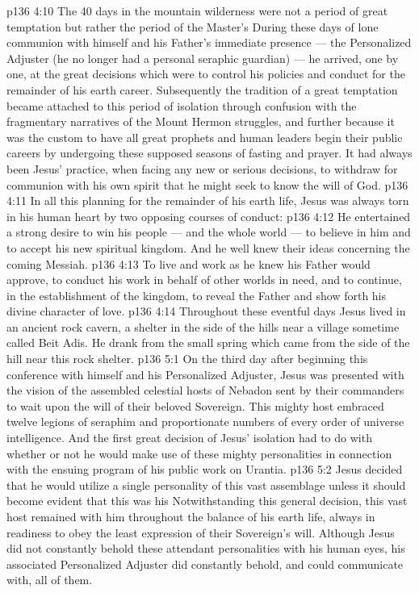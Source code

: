 \vs p136 4:10 \pc The 40 days in the mountain wilderness were not a period of great temptation but rather the period of the Master’s  During these days of lone communion with himself and his Father’s immediate presence --- the Personalized Adjuster (he no longer had a personal seraphic guardian) --- he arrived, one by one, at the great decisions which were to control his policies and conduct for the remainder of his earth career. Subsequently the tradition of a great temptation became attached to this period of isolation through confusion with the fragmentary narratives of the Mount Hermon struggles, and further because it was the custom to have all great prophets and human leaders begin their public careers by undergoing these supposed seasons of fasting and prayer. It had always been Jesus’ practice, when facing any new or serious decisions, to withdraw for communion with his own spirit that he might seek to know the will of God.
\vs p136 4:11 \pc In all this planning for the remainder of his earth life, Jesus was always torn in his human heart by two opposing courses of conduct:
\vs p136 4:12 \bibnobreakspace He entertained a strong desire to win his people --- and the whole world --- to believe in him and to accept his new spiritual kingdom. And he well knew their ideas concerning the coming Messiah.
\vs p136 4:13 \bibnobreakspace To live and work as he knew his Father would approve, to conduct his work in behalf of other worlds in need, and to continue, in the establishment of the kingdom, to reveal the Father and show forth his divine character of love.
\vs p136 4:14 \pc Throughout these eventful days Jesus lived in an ancient rock cavern, a shelter in the side of the hills near a village sometime called Beit Adis. He drank from the small spring which came from the side of the hill near this rock shelter.
\vs p136 5:1 On the third day after beginning this conference with himself and his Personalized Adjuster, Jesus was presented with the vision of the assembled celestial hosts of Nebadon sent by their commanders to wait upon the will of their beloved Sovereign. This mighty host embraced twelve legions of seraphim and proportionate numbers of every order of universe intelligence. And the first great decision of Jesus’ isolation had to do with whether or not he would make use of these mighty personalities in connection with the ensuing program of his public work on Urantia.
\vs p136 5:2 Jesus decided that he would  utilize a single personality of this vast assemblage unless it should become evident that this was his  Notwithstanding this general decision, this vast host remained with him throughout the balance of his earth life, always in readiness to obey the least expression of their Sovereign’s will. Although Jesus did not constantly behold these attendant personalities with his human eyes, his associated Personalized Adjuster did constantly behold, and could communicate with, all of them.
